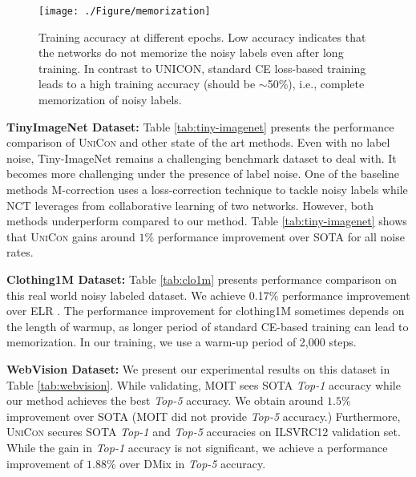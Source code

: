 \documentclass[10pt,twocolumn,letterpaper]{article}
\begin{document}
\begin{figure}
    \centering
    \texttt{[image: ./Figure/memorization]}
    \vspace{-2mm}
    \caption{Training accuracy at different epochs. Low accuracy indicates that the networks do not memorize the noisy labels even after long training. In contrast to UNICON, standard CE loss-based training leads to a high training accuracy (should be $\sim$50\%), i.e., complete memorization of noisy labels.}
    \label{fig:memorization}
    \vspace{-2mm}
\end{figure}
\textbf{TinyImageNet Dataset:} Table \ref{tab:tiny-imagenet} presents the performance comparison of \textsc{UniCon} and other state of the art methods. 
Even with no label noise, Tiny-ImageNet remains a challenging benchmark dataset to deal with. It becomes more challenging under the presence of label noise. One of the baseline methods M-correction \cite{arazo2019unsupervised} uses a loss-correction technique to tackle noisy labels while NCT \cite{sarfraz2020noisy} leverages from collaborative learning of two networks. However, both methods underperform compared to our method. Table \ref{tab:tiny-imagenet} shows that \textsc{UniCon} gains around $1\%$ performance improvement over SOTA for all noise rates. 


 \textbf{Clothing1M Dataset:} 
Table \ref{tab:clo1m} presents performance comparison on this real world noisy labeled dataset. 
We achieve 0.17\% performance improvement over ELR \cite{liu2020earlylearning}. The performance improvement for clothing1M sometimes depends on the length of warmup, as longer period of standard CE-based training can lead to memorization. In our training, we use a warm-up period of 2,000 steps.  

\textbf{WebVision Dataset:} We present our experimental results on this dataset in Table \ref{tab:webvision}. While validating, MOIT \cite{ortego2021multiobjective} sees SOTA \emph{Top-1} accuracy while our method achieves the best  \emph{Top-5} accuracy. We obtain around $1.5\%$ improvement over SOTA (MOIT \cite{ortego2021multiobjective} did not provide \emph{Top-5} accuracy.)  Furthermore, \textsc{UniCon} secures SOTA \emph{Top-1} and \emph{Top-5} accuracies on ILSVRC12 validation set. While the gain in \emph{Top-1} accuracy is not significant, we achieve a performance improvement of $1.88\%$ over DMix \cite{li2020dividemix} in \emph{Top-5} accuracy. 
\end{document}

